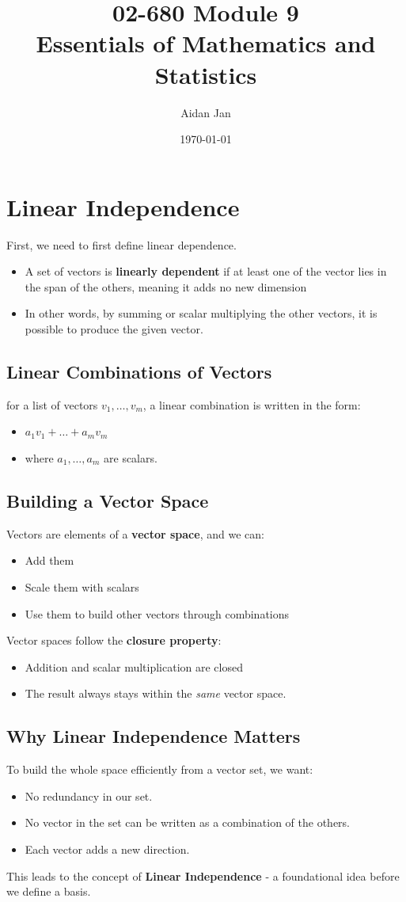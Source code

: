 \documentclass[10pt]{article}
\title{02-680 Module 9 \\ \large{Essentials of Mathematics and Statistics}}
\author{Aidan Jan}
\date{\today}
\begin{document}
\maketitle

\section*{Linear Independence}
First, we need to first define linear dependence.
\begin{itemize}
	\item A set of vectors is \textbf{linearly dependent} if at least one of the vector lies in the span of the others, meaning it adds no new dimension
	\item In other words, by summing or scalar multiplying the other vectors, it is possible to produce the given vector.
\end{itemize}

\subsection*{Linear Combinations of Vectors}
for a list of vectors $v_1, \dots, v_m$, a linear combination is written in the form:
\begin{itemize}
	\item $a_1 v_1 + \dots + a_m v_m$
	\item where $a_1, \dots, a_m$ are scalars.
\end{itemize}

\subsection*{Building a Vector Space}
Vectors are elements of a \textbf{vector space}, and we can:
\begin{itemize}
	\item Add them
	\item Scale them with scalars
	\item Use them to build other vectors through combinations
\end{itemize}
Vector spaces follow the \textbf{closure property}:
\begin{itemize}
	\item Addition and scalar multiplication are closed
	\item The result always stays within the \textit{same} vector space.
\end{itemize}

\subsection*{Why Linear Independence Matters}
To build the whole space efficiently from a vector set, we want:
\begin{itemize}
	\item No redundancy in our set.
	\item No vector in the set can be written as a combination of the others.
	\item Each vector adds a new direction.
\end{itemize}
This leads to the concept of \textbf{Linear Independence} - a foundational idea before we define a basis.
\end{document}
